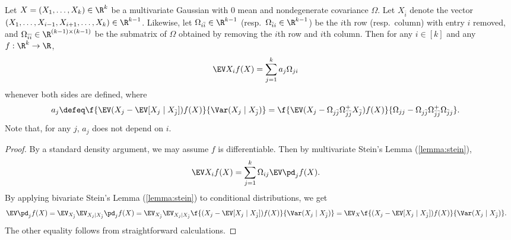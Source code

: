 \documentclass[main.tex]{subfiles}
\begin{document}
\begin{lemma}\label{lemma:EXf}
Let $X = (X_1, \ldots, X_k) \in \R^k$ be a multivariate Gaussian with 0 mean and nondegenerate covariance $\Omega$.
Let $X_{\bar i}$ denote the vector $(X_1, \ldots, X_{i-1}, X_{i+1}, \ldots, X_k) \in \R^{k-1}$.
Likewise, let $\Omega_{i \bar i} \in \R^{k-1}$ (resp.\ $\Omega_{\bar i i} \in \R^{k-1}$) be the $i$th row (resp.\ column) with entry $i$ removed,
and $\Omega_{\bar i \bar i} \in \R^{(k-1) \times (k-1)}$ be the submatrix of $\Omega$ obtained by removing the $i$th row and $i$th column.
Then for any $i \in [k]$ and any $f: \R^k \to \R$,
\begin{align*}
\EV X_i f(X)
  &=
    \sum_{j=1}^k a_j \Omega_{ji}
\end{align*}
whenever both sides are defined,
where
\begin{align*}
a_j
  &\defeq
    \f{\EV (X_j - \EV[X_j \mid X_{\bar j}]) f(X)}
    {\Var(X_j \mid X_{\bar j})}
  =
    \f{\EV (X_j - \Omega_{j\bar j} \Omega_{\bar j\bar j}^+ X_{\bar j}) f(X)}
    {\Omega_{jj} - \Omega_{j\bar j} \Omega_{\bar j\bar j}^+ \Omega_{\bar j j}}
    .
\end{align*}
Note that, for any $j$, $a_j$ does not depend on $i$.
\end{lemma}
\begin{proof}
By a standard density argument, we may assume $f$ is differentiable.
Then by multivariate Stein's Lemma (\cref{lemma:stein}),
\begin{align*}
\EV X_i f(X)
  &=
    \sum_{j=1}^k \Omega_{ij} \EV \pd_j f(X)
    .
\end{align*}
By applying bivariate Stein's Lemma (\cref{lemma:stein}) to conditional distributions, we get
\begin{align*}
\EV \pd_j f(X)
  &=
    \EV_{X_{\bar j}} \EV_{X_j | X_{\bar j}} \pd_j f(X)
  =
    \EV_{X_{\bar j}}
    \EV_{X_j | X_{\bar j}}
      \f{(X_j - \EV[X_j \mid X_{\bar j}]) f(X)}
      {\Var(X_j \mid X_{\bar j})}
  =
    \EV_{X}
      \f{(X_j - \EV[X_j \mid X_{\bar j}]) f(X)}
      {\Var(X_j \mid X_{\bar j})}
      .
\end{align*}
The other equality follows from straightforward calculations.
\end{proof}
\end{document}
